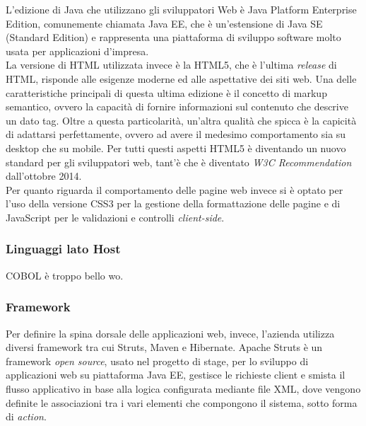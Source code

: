 			
	L'edizione di Java che utilizzano gli sviluppatori Web è Java Platform Enterprise Edition, comunemente chiamata Java EE, che è un'estensione di Java SE (Standard Edition) e rappresenta una piattaforma di sviluppo software molto usata per applicazioni d'impresa.\\%

	La versione di HTML utilizzata invece è la HTML5, che è l'ultima \textit{release} di HTML, risponde alle esigenze moderne ed alle aspettative dei siti web. Una delle caratteristiche principali di questa ultima edizione è il concetto di markup semantico, ovvero la capacità di fornire informazioni sul contenuto che descrive un dato tag. Oltre a questa particolarità, un'altra qualità che spicca è la capicità di adattarsi perfettamente, ovvero ad avere il medesimo comportamento sia su desktop che su mobile. Per tutti questi aspetti HTML5 è diventando un nuovo standard per gli sviluppatori web, tant'è che è diventato \textit{W3C Recommendation} dall'ottobre 2014.\\

	Per quanto riguarda il comportamento delle pagine web invece si è optato per l'uso della versione CSS3 per la gestione della formattazione delle pagine e di JavaScript per le validazioni e controlli \textit{client-side}.
	
	\subsubsection{Linguaggi lato Host}
	COBOL è troppo bello \tab wo.\\

	\subsubsection{Framework}
	Per definire la spina dorsale delle applicazioni web, invece, l'azienda utilizza diversi framework tra cui Struts, Maven e Hibernate. Apache Struts è un framework \textit{open source}, usato nel progetto di stage, per lo sviluppo di applicazioni web su piattaforma Java EE, gestisce le richieste client e smista il flusso applicativo in base alla logica configurata mediante file XML, dove vengono definite le associazioni tra i vari elementi che compongono il sistema, sotto forma di \textit{action}.\\
	
